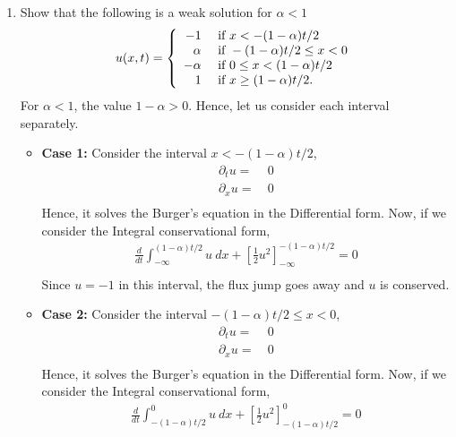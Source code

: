 \documentclass[11pt]{article}
\newcommand{\sbra}[1]{\left[#1\right]}
\begin{document}
\begin{enumerate}
  \begin{enumerate}
    \item {\color{blue}Show that the following is a weak solution for $\alpha<1$}
    \begin{align*}
      u(x,t) = \left\{\begin{array}{rl}
      -1 & \hbox{ if } x<-(1-\alpha)t/2 \\
      \alpha & \hbox{ if } -(1-\alpha)t/2\le x < 0 \\
      -\alpha & \hbox{ if } 0 \le x < (1-\alpha)t/2 \\
      1 & \hbox{ if } x \ge (1-\alpha)t/2.
      \end{array}
      \right.
    \end{align*}
    For $\alpha<1$, the value $1-\alpha>0$. Hence, let us consider each interval separately.
    \begin{itemize}
        \item {\bf Case 1:} Consider the interval $x<-(1-\alpha)t/2$, 
        \begin{align*}
            \partial_t u =& \ 0 \\
            \partial_x u =& \ 0 \\
        \end{align*}
        Hence, it solves the Burger's equation in the Differential form. Now, if we consider the Integral conservational form, 
        \begin{align*}
            \frac{d}{dt}\int_{-\infty}^{(1-\alpha)t/2} u \ dx + \sbra{\frac{1}{2}u^2}_{-\infty}^{-(1-\alpha)t/2} = 0 \\
        \end{align*}
        Since $u=-1$ in this interval, the flux jump goes away and $u$ is conserved. 
        \item {\bf Case 2:} Consider the interval $-(1-\alpha)t/2\leq x<0$, 
        \begin{align*}
            \partial_t u =& \ 0 \\
            \partial_x u =& \ 0 \\
        \end{align*}
        Hence, it solves the Burger's equation in the Differential form. Now, if we consider the Integral conservational form, 
        \begin{align*}
            \frac{d}{dt}\int_{-(1-\alpha)t/2}^{0} u \ dx + \sbra{\frac{1}{2}u^2}_{-(1-\alpha)t/2}^{0} = 0 \\
        \end{align*}

\end{itemize}
\end{enumerate}
\end{enumerate}
\end{document}
